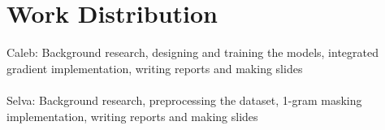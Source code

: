 \section{Work Distribution}

Caleb: Background research, designing and training the models, integrated gradient implementation, writing reports and making slides
\\ \\
Selva: Background research, preprocessing the dataset, 1-gram masking implementation, writing reports and making slides
